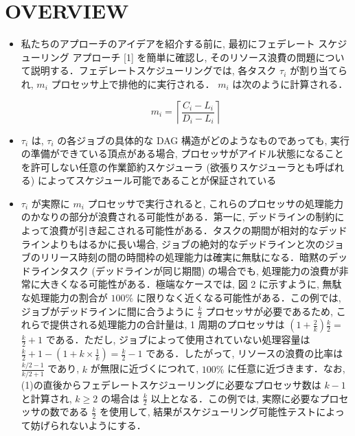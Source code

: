 
\section{OVERVIEW}
\label{sec: overview}

\begin{frame}{}
    \begin{itemize}
        \item 私たちのアプローチのアイデアを紹介する前に, 最初にフェデレート スケジューリング アプローチ [1] を簡単に確認し, そのリソース浪費の問題について説明する．フェデレートスケジューリングでは, 各タスク $\tau_{i}$ が割り当てられ, $m_{i}$ プロセッサ上で排他的に実行される． $m_{i}$ は次のように計算される．

              \begin{equation*}
                  m_{i}=\left\lceil\frac{C_{i}-L_{i}}{D_{i}-L_{i}}\right\rceil
              \end{equation*}
    \end{itemize}
\end{frame}

\begin{frame}{}
    \begin{itemize}
        \item  $\tau_{i}$ は, $\tau_{i}$ の各ジョブの具体的な DAG 構造がどのようなものであっても, 実行の準備ができている頂点がある場合, プロセッサがアイドル状態になることを許可しない任意の作業節約スケジューラ (欲張りスケジューラとも呼ばれる) によってスケジュール可能であることが保証されている
    \end{itemize}
\end{frame}

\begin{frame}{}
    \begin{itemize}
        \item $\tau_{i}$ が実際に $m_{i}$ プロセッサで実行されると, これらのプロセッサの処理能力のかなりの部分が浪費される可能性がある．第一に, デッドラインの制約によって浪費が引き起こされる可能性がある．タスクの期間が相対的なデッドラインよりもはるかに長い場合, ジョブの絶対的なデッドラインと次のジョブのリリース時刻の間の時間枠の処理能力は確実に無駄になる．暗黙のデッドラインタスク (デッドラインが同じ期間) の場合でも, 処理能力の浪費が非常に大きくなる可能性がある．極端なケースでは, 図 2 に示すように, 無駄な処理能力の割合が $100 \%$ に限りなく近くなる可能性がある．この例では, ジョブがデッドラインに間に合うように $\frac{k}{2}$ プロセッサが必要であるため, これらで提供される処理能力の合計量は, 1 周期のプロセッサは $\left(1+\frac{2}{k}\right) \frac{k}{2}=$  $\frac{k}{2}+1$ である．ただし, ジョブによって使用されていない処理容量は $\frac{k}{2}+1-\left(1+k \times \frac{1}{k}\right)=\frac{k}{2}-1$ である．したがって, リソースの浪費の比率は $\frac{k / 2-1}{k / 2+1}$ であり, $k$ が無限に近づくにつれて, $100 \%$ に任意に近づきます．なお, (1)の直後からフェデレートスケジューリングに必要なプロセッサ数は $k-1$ と計算され, $k \geq 2$ の場合は $\frac{k}{2}$ 以上となる．この例では, 実際に必要なプロセッサの数である $\frac{k}{2}$ を使用して, 結果がスケジューリング可能性テストによって妨げられないようにする．
    \end{itemize}
\end{frame}


